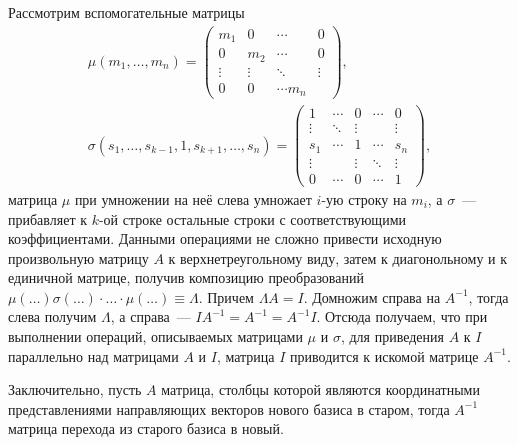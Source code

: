     Рассмотрим вспомогательные матрицы
    \begin{gather*}
        \mu(m_1, \ldots, m_n) = \begin{pmatrix}
            m_1 & 0 & \cdots & 0 \\
            0 & m_2 & \cdots & 0 \\
            \vdots & \vdots & \ddots & \vdots \\
            0 & 0 & \cdots m_n
        \end{pmatrix}, \\
        \sigma(s_1, \ldots, s_{k-1}, 1, s_{k+1}, \ldots , s_n) = \begin{pmatrix}
            1 & \cdots & 0 & \cdots & 0 \\
            \vdots & \ddots & \vdots &  & \vdots \\
            s_1 & \cdots & 1 & \cdots & s_n \\
            \vdots &  & \vdots & \ddots & \vdots \\
            0 & \cdots & 0 & \cdots & 1 
        \end{pmatrix},
    \end{gather*}
    матрица $\mu$ при умножении на неё слева умножает $i$-ую строку на $m_i$, а $\sigma$~--- прибавляет к $k$-ой строке остальные строки с соответствующими коэффициентами. Данными операциями не сложно привести исходную произвольную матрицу $A$ к верхнетреугольному виду, затем к диагонольному и к единичной матрице, получив композицию преобразований $\mu(\ldots)\sigma(\ldots)\cdot \ldots \cdot \mu(\ldots) \equiv \Lambda$. Причем $\Lambda A = I$. Домножим справа на $A^{-1}$, тогда слева получим $\Lambda$, а справа~--- $I A^{-1} = A^{-1} = A^{-1} I$. Отсюда получаем, что при выполнении операций, описываемых матрицами $\mu$ и $\sigma$, для приведения $A$ к $I$ параллельно над матрицами $A$ и $I$, матрица $I$ приводится к искомой матрице $A^{-1}$.   
    
    Заключительно, пусть $A$ матрица, столбцы которой являются координатными представлениями направляющих векторов нового базиса в старом, тогда $A^{-1}$ матрица перехода из старого базиса в новый. 
    
